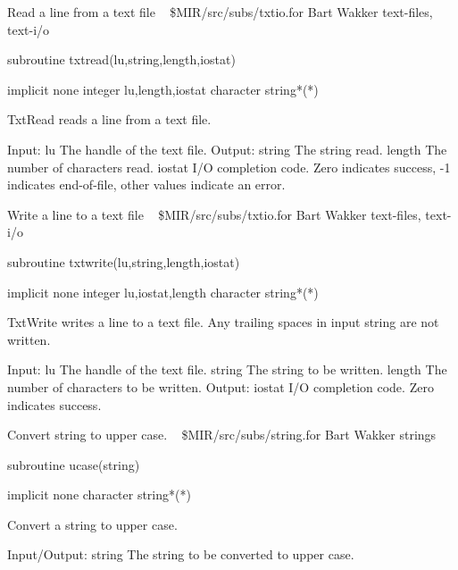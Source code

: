 %
\noindent Read a line from a text file
\newline \ 
\newline {} \$MIR/src/subs/txtio.for
\newline {} Bart Wakker
\newline {} text-files, text-i/o
\par{\tenpoint
{\eightpoint\begintt
        subroutine txtread(lu,string,length,iostat)

        implicit none
        integer lu,length,iostat
        character string*(*)

  TxtRead reads a line from a text file.

  Input:
    lu         The handle of the text file.
  Output:
    string     The string read.
    length     The number of characters read.
    iostat     I/O completion code. Zero indicates success, -1 indicates
               end-of-file, other values indicate an error.
\endtt}
\par}
%
\noindent Write a line to a text file
\newline \ 
\newline {} \$MIR/src/subs/txtio.for
\newline {} Bart Wakker
\newline \abox{Keywords:} text-files, text-i/o
\par{\tenpoint
{\eightpoint\begintt
        subroutine txtwrite(lu,string,length,iostat)

        implicit none
        integer lu,iostat,length
        character string*(*)

  TxtWrite writes a line to a text file. Any trailing spaces in input
  string are not written.

  Input:
    lu         The handle of the text file.
    string     The string to be written.
    length     The number of characters to be written.
  Output:
    iostat     I/O completion code. Zero indicates success.
\endtt}
\par}
%
\noindent Convert string to upper case.
\newline \ 
\newline {} \$MIR/src/subs/string.for
\newline \abox{Responsible:} Bart Wakker
\newline {} strings
\par{\tenpoint
{\eightpoint\begintt
        subroutine ucase(string)

        implicit none
        character string*(*)

  Convert a string to upper case.

  Input/Output:
    string     The string to be converted to upper case.
\endtt}
\par}
